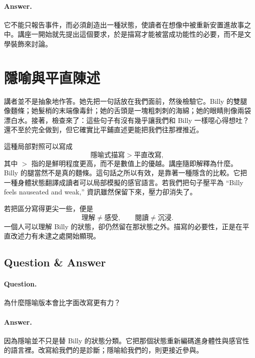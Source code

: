 \paragraph{Answer.} 它不能只報告事件，而必須創造出一種狀態，使讀者在想像中被重新安置進故事之中。講座一開始就先提出這個要求，於是描寫才能被當成功能性的必要，而不是文學裝飾來討論。

\section{隱喻與平直陳述}

講者並不是抽象地作答。她先把一句話放在我們面前，然後檢驗它。Billy 的雙腿像麵條；她髮梢的末端像毒針；她的舌頭是一塊粗刺刺的海綿；她的眼睛則像兩袋漂白水。接著，檢查來了：這些句子有沒有幾乎讓我們和 Billy 一樣噁心得想吐？還不至於完全做到，但它確實比平鋪直述更能把我們往那裡推近。

這種局部對照可以寫成
\begin{equation}
\text{隱喻式描寫} > \text{平直改寫},
\end{equation}
其中 \(>\) 指的是鮮明程度更高，而不是數值上的優越。講座隨即解釋為什麼。Billy 的腿當然不是真的麵條。這句話之所以有效，是靠著一種隱含的比較。它把一種身體狀態翻譯成讀者可以局部模擬的感官語言。若我們把句子壓平為 ``Billy feels nauseated and weak,'' 資訊雖然保留下來，壓力卻消失了。

若把區分寫得更尖一些，便是
\begin{equation}
\text{理解} \neq \text{感受}, \qquad
\text{閱讀} \neq \text{沉浸}.
\end{equation}
一個人可以理解 Billy 的狀態，卻仍然留在那狀態之外。描寫的必要性，正是在平直改述力有未逮之處開始顯現。

\subsection{Question \& Answer}

\paragraph{Question.} 為什麼隱喻版本會比字面改寫更有力？

\paragraph{Answer.} 因為隱喻並不只是替 Billy 的狀態分類。它把那個狀態重新編碼進身體性與感官性的語言裡。改寫給我們的是診斷；隱喻給我們的，則更接近參與。

